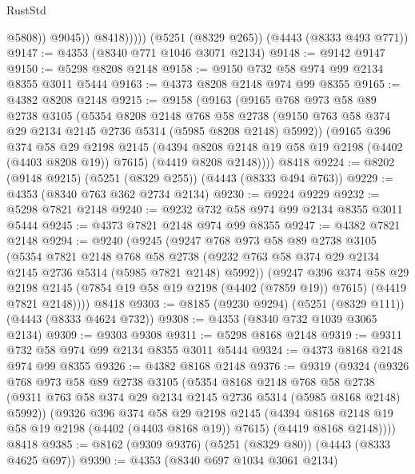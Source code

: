 \begin{lexlean}{RustStd}
\begin{coremodule}
                      @5808))
                  @9045))
              @8418)))))
    (@5251 (@8329 @265))
    (@4443 (@8333 @493 @771))
@9147 := @4353 (@8340 @771 @1046 @3071 @2134)
@9148 := @9142 @9147
@9150 := @5298 @8208 @2148
@9158 := @9150 @732 @58 @974 @99 @2134 @8355 @3011 @5444
@9163 := @4373 @8208 @2148 @974 @99 @8355
@9165 := @4382 @8208 @2148
@9215 := @9158
    (@9163
      (@9165
        @768
        @973
        @58
        @89
        @2738
        @3105
        (@5354
          @8208
          @2148
          @768
          @58
          @2738
          (@9150 @763 @58 @374 @29 @2134 @2145 @2736 @5314 (@5985 @8208 @2148) @5992))
        (@9165
          @396
          @374
          @58
          @29
          @2198
          @2145
          (@4394 @8208 @2148 @19 @58 @19 @2198 (@4402 (@4403 @8208 @19)) @7615)
          (@4419 @8208 @2148))))
    @8418
@9224 := @8202 (@9148 @9215) (@5251 (@8329 @255)) (@4443 (@8333 @494 @763))
@9229 := @4353 (@8340 @763 @362 @2734 @2134)
@9230 := @9224 @9229
@9232 := @5298 @7821 @2148
@9240 := @9232 @732 @58 @974 @99 @2134 @8355 @3011 @5444
@9245 := @4373 @7821 @2148 @974 @99 @8355
@9247 := @4382 @7821 @2148
@9294 := @9240
    (@9245
      (@9247
        @768
        @973
        @58
        @89
        @2738
        @3105
        (@5354
          @7821
          @2148
          @768
          @58
          @2738
          (@9232 @763 @58 @374 @29 @2134 @2145 @2736 @5314 (@5985 @7821 @2148) @5992))
        (@9247
          @396
          @374
          @58
          @29
          @2198
          @2145
          (@7854 @19 @58 @19 @2198 (@4402 (@7859 @19)) @7615)
          (@4419 @7821 @2148))))
    @8418
@9303 := @8185 (@9230 @9294) (@5251 (@8329 @111)) (@4443 (@8333 @4624 @732))
@9308 := @4353 (@8340 @732 @1039 @3065 @2134)
@9309 := @9303 @9308
@9311 := @5298 @8168 @2148
@9319 := @9311 @732 @58 @974 @99 @2134 @8355 @3011 @5444
@9324 := @4373 @8168 @2148 @974 @99 @8355
@9326 := @4382 @8168 @2148
@9376 := @9319
    (@9324
      (@9326
        @768
        @973
        @58
        @89
        @2738
        @3105
        (@5354
          @8168
          @2148
          @768
          @58
          @2738
          (@9311 @763 @58 @374 @29 @2134 @2145 @2736 @5314 (@5985 @8168 @2148) @5992))
        (@9326
          @396
          @374
          @58
          @29
          @2198
          @2145
          (@4394 @8168 @2148 @19 @58 @19 @2198 (@4402 (@4403 @8168 @19)) @7615)
          (@4419 @8168 @2148))))
    @8418
@9385 := @8162 (@9309 @9376) (@5251 (@8329 @80)) (@4443 (@8333 @4625 @697))
@9390 := @4353 (@8340 @697 @1034 @3061 @2134)

\end{coremodule}
\end{lexlean}
